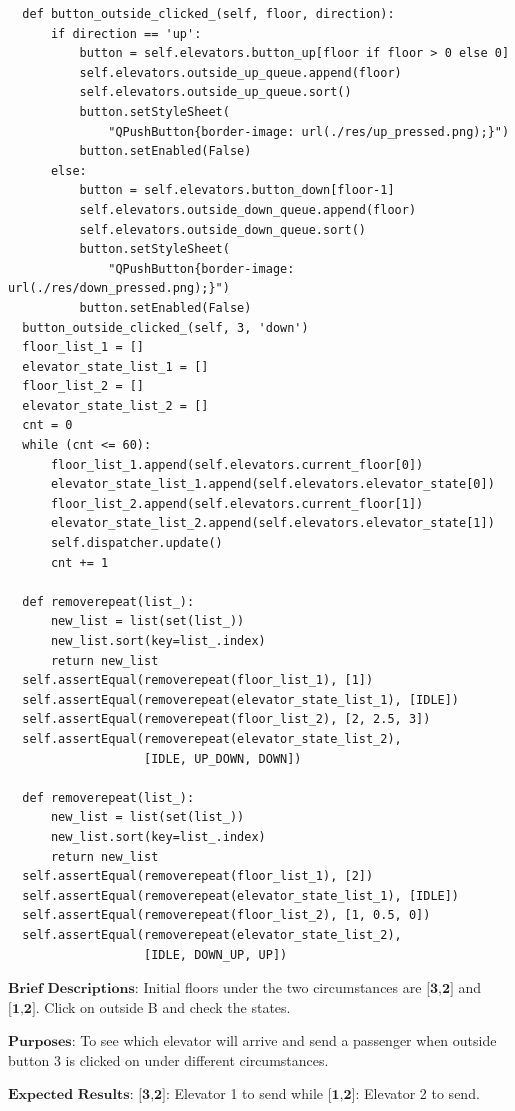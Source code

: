 \documentclass{article}
\begin{document}
\begin{lstlisting}
  def button_outside_clicked_(self, floor, direction):
      if direction == 'up':
          button = self.elevators.button_up[floor if floor > 0 else 0]
          self.elevators.outside_up_queue.append(floor)
          self.elevators.outside_up_queue.sort()
          button.setStyleSheet(
              "QPushButton{border-image: url(./res/up_pressed.png);}")
          button.setEnabled(False)
      else:
          button = self.elevators.button_down[floor-1]
          self.elevators.outside_down_queue.append(floor)
          self.elevators.outside_down_queue.sort()
          button.setStyleSheet(
              "QPushButton{border-image: url(./res/down_pressed.png);}")
          button.setEnabled(False)
  button_outside_clicked_(self, 3, 'down')
  floor_list_1 = []
  elevator_state_list_1 = []
  floor_list_2 = []
  elevator_state_list_2 = []
  cnt = 0
  while (cnt <= 60):
      floor_list_1.append(self.elevators.current_floor[0])
      elevator_state_list_1.append(self.elevators.elevator_state[0])
      floor_list_2.append(self.elevators.current_floor[1])
      elevator_state_list_2.append(self.elevators.elevator_state[1])
      self.dispatcher.update()
      cnt += 1

  def removerepeat(list_):
      new_list = list(set(list_))
      new_list.sort(key=list_.index)
      return new_list
  self.assertEqual(removerepeat(floor_list_1), [1])
  self.assertEqual(removerepeat(elevator_state_list_1), [IDLE])
  self.assertEqual(removerepeat(floor_list_2), [2, 2.5, 3])
  self.assertEqual(removerepeat(elevator_state_list_2),
                   [IDLE, UP_DOWN, DOWN])

  def removerepeat(list_):
      new_list = list(set(list_))
      new_list.sort(key=list_.index)
      return new_list
  self.assertEqual(removerepeat(floor_list_1), [2])
  self.assertEqual(removerepeat(elevator_state_list_1), [IDLE])
  self.assertEqual(removerepeat(floor_list_2), [1, 0.5, 0])
  self.assertEqual(removerepeat(elevator_state_list_2),
                   [IDLE, DOWN_UP, UP])
\end{lstlisting}

$\textbf{Brief Descriptions:}$
Initial floors under the two circumstances are $\textbf{[3,2]}$ and $\textbf{[1,2]}$. Click on outside B and check the states.

$\textbf{Purposes:}$
To see which elevator will arrive and send a passenger when outside button 3 is clicked on under different circumstances.

$\textbf{Expected Results:}$
$\textbf{[3,2]}$: Elevator 1 to send while $\textbf{[1,2]}$: Elevator 2 to send.
\end{document}
